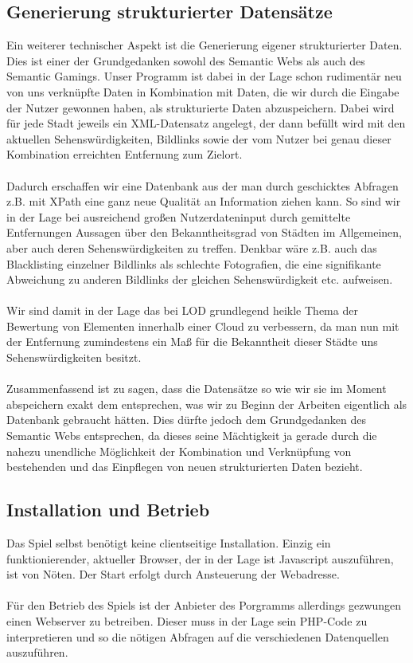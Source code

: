\documentclass[a4paper, 11pt]{article}
\begin{document}
\subsection{Generierung strukturierter Datensätze}
\label{sec:gen-struk-daten}
Ein weiterer technischer Aspekt ist die Generierung eigener strukturierter Daten. Dies ist einer der Grundgedanken sowohl des Semantic Webs als auch des Semantic Gamings. Unser Programm ist dabei in der Lage schon rudimentär neu von uns verknüpfte Daten in Kombination mit Daten, die wir durch die Eingabe der Nutzer gewonnen haben, als strukturierte Daten abzuspeichern. Dabei wird für jede Stadt jeweils ein XML-Datensatz angelegt, der dann befüllt wird mit den aktuellen Sehenswürdigkeiten, Bildlinks sowie der vom Nutzer bei genau dieser Kombination erreichten Entfernung zum Zielort.\\\\ Dadurch erschaffen wir eine Datenbank aus der man durch geschicktes Abfragen z.B. mit XPath eine ganz neue Qualität an Information ziehen kann. So sind wir in der Lage bei ausreichend großen Nutzerdateninput durch gemittelte Entfernungen Aussagen über den Bekanntheitsgrad von Städten im Allgemeinen, aber auch deren Sehenswürdigkeiten zu treffen. Denkbar wäre z.B. auch das Blacklisting einzelner Bildlinks als schlechte Fotografien, die eine signifikante Abweichung zu anderen Bildlinks der gleichen Sehenswürdigkeit etc. aufweisen.\\\\
Wir sind damit in der Lage das bei LOD grundlegend heikle Thema der Bewertung von Elementen innerhalb einer Cloud zu verbessern, da man nun mit der Entfernung zumindestens ein Maß für die Bekanntheit dieser Städte uns Sehenswürdigkeiten besitzt.\\\\
Zusammenfassend ist zu sagen, dass die Datensätze so wie wir sie im Moment abspeichern exakt dem entsprechen, was wir zu Beginn der Arbeiten eigentlich als Datenbank gebraucht hätten. Dies dürfte jedoch dem Grundgedanken des Semantic Webs entsprechen, da dieses seine Mächtigkeit ja gerade durch die nahezu unendliche Möglichkeit der Kombination und Verknüpfung von bestehenden und das Einpflegen von neuen strukturierten Daten bezieht.
\subsection{Installation und Betrieb}
Das Spiel selbst benötigt keine clientseitige Installation. Einzig ein funktionierender, aktueller Browser, der in der Lage ist Javascript auszuführen, ist von Nöten. Der Start erfolgt durch Ansteuerung der Webadresse.\\\\
Für den Betrieb des Spiels ist der Anbieter des Porgramms allerdings gezwungen einen Webserver zu betreiben. Dieser muss in der Lage sein PHP-Code zu interpretieren und so die nötigen Abfragen auf die verschiedenen Datenquellen auszuführen.
\newpage
\end{document}
